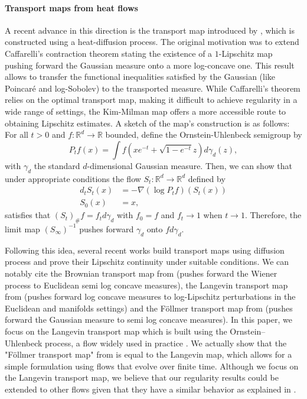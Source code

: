 \documentclass{article}
\begin{document}
\paragraph*{Transport maps from heat flows}
A recent advance in this direction is the transport map introduced by \cite{kim2012generalization}, which is constructed using a heat-diffusion process. The original motivation was to extend Caffarelli's contraction theorem \citep{caffarelli2000monotonicity} stating the existence of a $1$-Lipschitz map pushing forward the
Gaussian measure onto a more log-concave one. This result allows to transfer the  functional inequalities satisfied by the Gaussian (like Poincaré and log-Sobolev) to the transported measure.
 While Caffarelli's theorem relies on the optimal transport map, making it difficult to achieve regularity in a wide range of settings, the Kim-Milman map offers a more accessible route to obtaining Lipschitz estimates. A sketch of the map's construction is as follows:\\
For all $t>0$ and $f:\mathbb{R}^d\rightarrow \mathbb{R}$ bounded, define  the Ornstein-Uhlenbeck semigroup by
$$P_tf(x)=\int f(xe^{-t}+\sqrt{1-e^{-t}}z)d\gamma_d(z),$$
with $\gamma_d$ the standard $d$-dimensional Gaussian measure. Then, we can show that under appropriate conditions the flow $S_t:\mathbb{R}^d\rightarrow \mathbb{R}^d$ defined by
\begin{align*}
d_tS_t(x)&=-\nabla (\log P_tf)(S_t(x))\\
S_0(x) & = x,
\end{align*}
satisfies that $(S_t)_{\# }f=f_t d\gamma_d$ with $f_0=f$ and $f_t\rightarrow 1$ when $t\rightarrow 1$. Therefore, the limit map \emph{$(S_\infty)^{-1}$} pushes forward $\gamma_d$ onto $fd\gamma_d$.

Following this idea, several recent works build transport maps using diffusion process and prove their Lipschitz continuity under suitable conditions. We can notably cite the  Brownian transport map  from \cite{mikulincer2024brownian} (pushes forward the Wiener process to Euclidean semi log concave measures), the  Langevin transport map  from \cite{fathi2024transportation} (pushes forward log concave measures to log-Lipschitz perturbations in the Euclidean and manifolds settings) and the  Föllmer transport map  from \cite{dai2023lipschitz}  (pushes forward the Gaussian measure to semi log concave measures).  In this paper, we focus on the Langevin transport map which is built using the Ornstein–Uhlenbeck process, a flow widely used in practice \citep{song2020score,bjork2009arbitrage,davies1973harmonic}. We actually show that the "Föllmer transport map" from \cite{dai2023lipschitz} is equal to the Langevin map, which allows for a simple formulation using flows that evolve over finite time. 
Although we focus on the Langevin transport map, we believe that our regularity results could be extended to other flows given that they have a similar behavior as explained in \cite{gao2023Gaussian}. 
\end{document}
